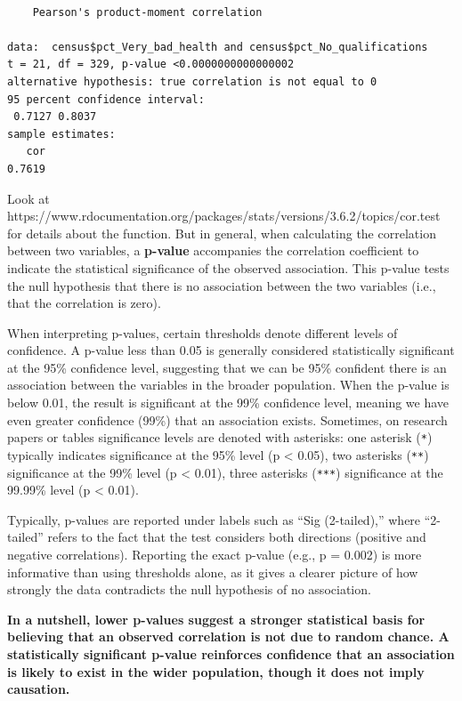 \documentclass[
  letterpaper,
  DIV=11,
  numbers=noendperiod]{scrreprt}
\begin{document}
\begin{verbatim}

    Pearson's product-moment correlation

data:  census$pct_Very_bad_health and census$pct_No_qualifications
t = 21, df = 329, p-value <0.0000000000000002
alternative hypothesis: true correlation is not equal to 0
95 percent confidence interval:
 0.7127 0.8037
sample estimates:
   cor 
0.7619 
\end{verbatim}

Look at
https://www.rdocumentation.org/packages/stats/versions/3.6.2/topics/cor.test
for details about the function. But in general, when calculating the
correlation between two variables, a \textbf{p-value} accompanies the
correlation coefficient to indicate the statistical significance of the
observed association. This p-value tests the null hypothesis that there
is no association between the two variables (i.e., that the correlation
is zero).

When interpreting p-values, certain thresholds denote different levels
of confidence. A p-value less than 0.05 is generally considered
statistically significant at the 95\% confidence level, suggesting that
we can be 95\% confident there is an association between the variables
in the broader population. When the p-value is below 0.01, the result is
significant at the 99\% confidence level, meaning we have even greater
confidence (99\%) that an association exists. Sometimes, on research
papers or tables significance levels are denoted with asterisks: one
asterisk (\texttt{*}) typically indicates significance at the 95\% level
(p \textless{} 0.05), two asterisks (\texttt{**}) significance at the
99\% level (p \textless{} 0.01), three asterisks (\texttt{***})
significance at the 99.99\% level (p \textless{} 0.01).

Typically, p-values are reported under labels such as ``Sig
(2-tailed),'' where ``2-tailed'' refers to the fact that the test
considers both directions (positive and negative correlations).
Reporting the exact p-value (e.g., p = 0.002) is more informative than
using thresholds alone, as it gives a clearer picture of how strongly
the data contradicts the null hypothesis of no association.

\textbf{In a nutshell, lower p-values suggest a stronger statistical
basis for believing that an observed correlation is not due to random
chance. A statistically significant p-value reinforces confidence that
an association is likely to exist in the wider population, though it
does not imply causation.}
\end{document}
